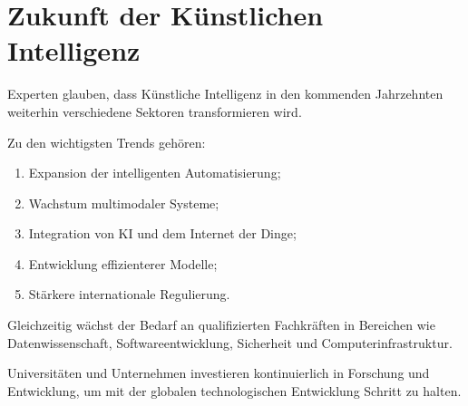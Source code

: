 \section{Zukunft der Künstlichen Intelligenz}

Experten glauben, dass Künstliche Intelligenz in den kommenden Jahrzehnten weiterhin verschiedene Sektoren
transformieren wird.

Zu den wichtigsten Trends gehören:

\begin{enumerate}
    \item Expansion der intelligenten Automatisierung;
    \item Wachstum multimodaler Systeme;
    \item Integration von KI und dem Internet der Dinge;
    \item Entwicklung effizienterer Modelle;
    \item Stärkere internationale Regulierung.
\end{enumerate}

Gleichzeitig wächst der Bedarf an qualifizierten Fachkräften in Bereichen wie
Datenwissenschaft, Softwareentwicklung, Sicherheit und Computerinfrastruktur.

Universitäten und Unternehmen investieren kontinuierlich in Forschung und Entwicklung, um
mit der globalen technologischen Entwicklung Schritt zu halten. 